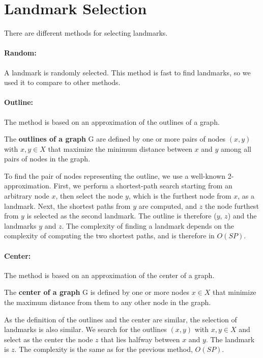 \section{Landmark Selection}
\label{sec:LandmarkSelection}

There are different methods for selecting landmarks.
    \paragraph*{Random:}         
        A landmark is randomly selected. This method is fast to find landmarks, so we used it to compare to other methods. 
        
    \paragraph*{Outline:}
    The method is based on an approximation of the outlines of a graph.
        \begin{definition}
            The \textbf{outlines of a graph} G are defined by one or more pairs of nodes $(x, y)$ with $x, y \in X$ that maximize the minimum distance between $x$ and $y$ among all pairs of nodes in the graph.
        \end{definition}
To find the pair of nodes representing the outline, we use a well-known 2-approximation. First, we perform a shortest-path search starting from an arbitrary node $x$, then select the node $y$, which is the furthest node from $x$, as a landmark. Next, the shortest paths from $y$ are computed, and $z$ the node furthest from $y$ is selected as the second landmark. The outline is therefore ($y$, $z$) and the landmarks $y$ and $z$.
The complexity of finding a landmark depends on the complexity of computing the two shortest paths, and is therefore in $O(SP)$.        
    \paragraph*{Center:}
        The method is based on an approximation of the center of a graph.
        \begin{definition}
            The \textbf{center of a graph} G is defined by one or more nodes $x \in X$ that minimize the maximum distance from them to any other node in the graph.
        \end{definition}
As the definition of the outlines and the center are 
similar, the selection of landmarks is also similar. We search for the outlines $(x, y)$ with $x, y \in X$ and select as the center the node $z$ that lies halfway between $x$ and $y$. The landmark is $z$. 
The complexity is the same as for the previous method, $O(SP)$.

